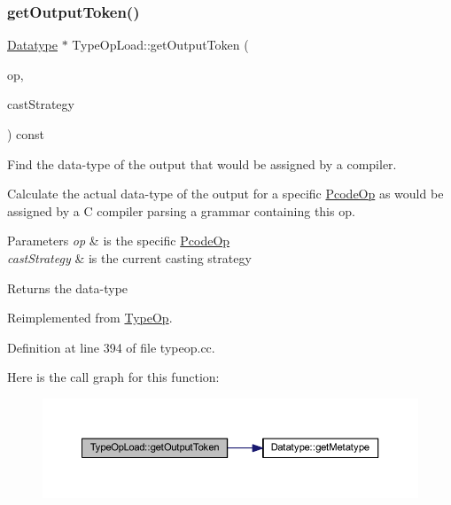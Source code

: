\subsubsection{\texorpdfstring{getOutputToken()}{getOutputToken()}}
{\footnotesize\ttfamily \mbox{\hyperlink{class_datatype}{Datatype}} $\ast$ Type\+Op\+Load\+::get\+Output\+Token (\begin{DoxyParamCaption}\item[{const \mbox{\hyperlink{class_pcode_op}{Pcode\+Op}} $\ast$}]{op,  }\item[{\mbox{\hyperlink{class_cast_strategy}{Cast\+Strategy}} $\ast$}]{cast\+Strategy }\end{DoxyParamCaption}) const\hspace{0.3cm}{\ttfamily [virtual]}}



Find the data-\/type of the output that would be assigned by a compiler. 

Calculate the actual data-\/type of the output for a specific \mbox{\hyperlink{class_pcode_op}{Pcode\+Op}} as would be assigned by a C compiler parsing a grammar containing this op. 
\begin{DoxyParams}{Parameters}
{\em op} & is the specific \mbox{\hyperlink{class_pcode_op}{Pcode\+Op}} \\
\hline
{\em cast\+Strategy} & is the current casting strategy \\
\hline
\end{DoxyParams}
\begin{DoxyReturn}{Returns}
the data-\/type 
\end{DoxyReturn}


Reimplemented from \mbox{\hyperlink{class_type_op_a7150ac93bb03a993735c829deb5237e7}{Type\+Op}}.



Definition at line 394 of file typeop.\+cc.

Here is the call graph for this function\+:
\nopagebreak
\begin{figure}[H]
\begin{center}
\leavevmode
\includegraphics[width=350pt]{class_type_op_load_a212b3d08a86b73ca49c2adf1aac7b60a_cgraph}
\end{center}
\end{figure}
\mbox{\label{class_type_op_load_a816c1525151795d00561fdea1d37806c}} 
